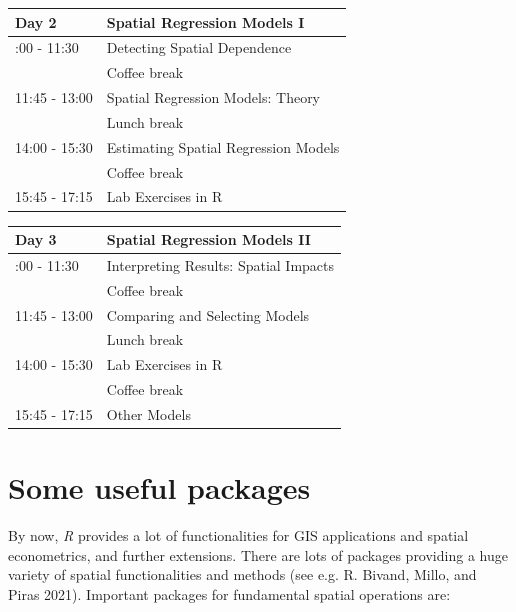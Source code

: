\documentclass[
  letterpaper,
]{scrbook}
\begin{document}
\begin{longtable}[]{@{}ll@{}}
\toprule\noalign{}
Day 2 & Spatial Regression Models I \\
\midrule\noalign{}
\endhead
\bottomrule\noalign{}
\endlastfoot
10:00 - 11:30 & Detecting Spatial Dependence \\
& Coffee break \\
11:45 - 13:00 & Spatial Regression Models: Theory \\
& Lunch break \\
14:00 - 15:30 & Estimating Spatial Regression Models \\
& Coffee break \\
15:45 - 17:15 & Lab Exercises in R \\
\end{longtable}

\begin{longtable}[]{@{}ll@{}}
\toprule\noalign{}
Day 3 & Spatial Regression Models II \\
\midrule\noalign{}
\endhead
\bottomrule\noalign{}
\endlastfoot
10:00 - 11:30 & Interpreting Results: Spatial Impacts \\
& Coffee break \\
11:45 - 13:00 & Comparing and Selecting Models \\
& Lunch break \\
14:00 - 15:30 & Lab Exercises in R \\
& Coffee break \\
15:45 - 17:15 & Other Models \\
\end{longtable}

\hypertarget{some-useful-packages}{%
\section*{Some useful packages}\label{some-useful-packages}}


By now, \emph{R} provides a lot of functionalities for GIS applications
and spatial econometrics, and further extensions. There are lots of
packages providing a huge variety of spatial functionalities and methods
(see e.g. R. Bivand, Millo, and Piras 2021). Important packages for
fundamental spatial operations are:
\end{document}
